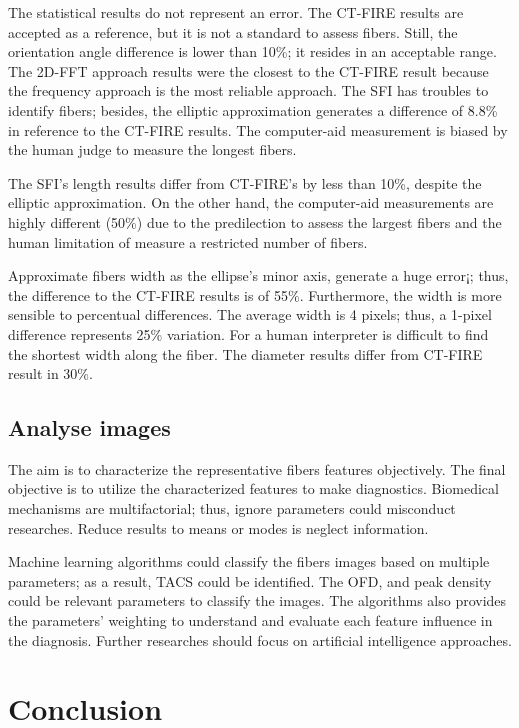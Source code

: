 \documentclass[12pt,a4paper]{article}
\begin{document}
The statistical results do not represent an error. The CT-FIRE results are accepted as a reference, but it is not a standard to assess fibers. Still, the orientation angle difference is lower than 10\%; it resides in an acceptable range. The 2D-FFT approach results were the closest to the CT-FIRE result because the frequency approach is the most reliable approach. The SFI has troubles to identify fibers; besides, the elliptic approximation generates a difference of 8.8\% in reference to the CT-FIRE results. The computer-aid measurement is biased by the human judge to measure the longest fibers. 
 
The SFI's length results differ from CT-FIRE's by less than 10\%, despite the elliptic approximation. On the other hand, the computer-aid measurements are highly different (50\%) due to the predilection to assess the largest fibers and the human limitation of measure a restricted number of fibers.
 
Approximate fibers width as the ellipse's minor axis, generate a huge error¡; thus, the difference to the CT-FIRE results is of 55\%. Furthermore, the width is more sensible to percentual differences. The average width is 4 pixels; thus, a 1-pixel difference represents 25\% variation. For a human interpreter is difficult to find the shortest width along the fiber.  The diameter results differ from CT-FIRE result in 30\%. 

\subsection{Analyse images}
The aim is to characterize the representative fibers features objectively. The final objective is to utilize the characterized features to make diagnostics.  Biomedical mechanisms are multifactorial; thus, ignore parameters could misconduct researches. Reduce results to means or modes is neglect information.

Machine learning algorithms could classify the fibers images based on multiple parameters; as a result, TACS could be identified. The OFD, and peak density could be relevant parameters to classify the images. The algorithms also provides the parameters' weighting to understand and evaluate each feature influence in the diagnosis. Further researches should focus on artificial intelligence approaches. 

\section{Conclusion}
\end{document}
